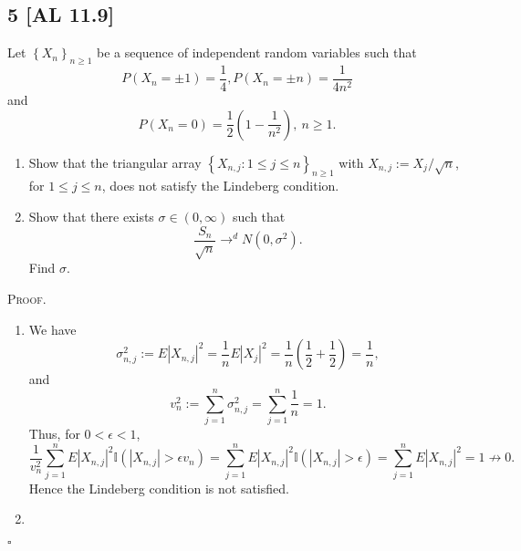 \documentclass[12pt]{article}
\newcounter{ProofCounter}
\newenvironment{Proof}{\stepcounter{ProofCounter}\textsc{Proof.}}{\hfill$\square$}
\begin{document}
\subsection*{5 [AL 11.9]}
\begin{tcolorbox}
  Let $\left\{ X_n \right\}_{n\geq 1}$ be a sequence of independent random variables such that 
  \[ P(X_{n} = \pm 1) = \frac{1}{4}, P(X_{n} = \pm n) = \frac{1}{4n^{2}} \]
  and 
  \[ P(X_{n} = 0) = \frac{1}{2}\left( 1 - \frac{1}{n^{2}} \right), \ n \geq 1. \]
  \begin{enumerate}[label = (\alph*)]
    \item Show that the triangular array $\left\{ X_{n,j} : 1 \leq j \leq n \right\}_{n\geq 1}$ with $X_{n,j} := X_{j}/\sqrt{n}$, for $1 \leq j \leq
      n$, does not satisfy the Lindeberg condition.
    \item Show that there exists $\sigma \in (0,\infty)$ such that 
      \[ \frac{S_n}{\sqrt{n}} \rightarrow^{d}N(0,\sigma^{2}). \]
      Find $\sigma$.
  \end{enumerate}
\end{tcolorbox}
\begin{Proof}
  \begin{enumerate}[label = (\alph*)]
    \item We have 
      \[ \sigma_{n,j}^{2} := E|X_{n,j}|^{2} = \frac{1}{n}E|X_{j}|^{2} = \frac{1}{n}\left( \frac{1}{2} + \frac{1}{2} \right) = \frac{1}{n}, \]
      and 
      \[ v_{n}^{2} := \sum_{j=1}^{n}\sigma_{n,j}^{2} = \sum_{j=1}^{n}\frac{1}{n} = 1. \]
      Thus, for $0 < \epsilon < 1$,
      \[ 
        \frac{1}{v_{n}^{2}}\sum_{j=1}^{n}E|X_{n,j}|^{2}\mathbb{I} (|X_{n,j}| > \epsilon v_{n}) = \sum_{j=1}^{n}E|X_{n,j}|^{2}\mathbb{I} (|X_{n,j}| >
        \epsilon) = \sum_{j=1}^{n}E|X_{n,j}|^{2} = 1 \not\rightarrow 0. 
      \]
      Hence the Lindeberg condition is not satisfied.
    \item 
  \end{enumerate}
\end{Proof}



\newpage
\end{document}

